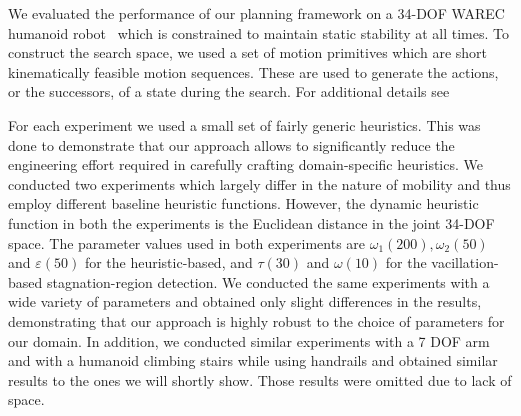 \documentclass{article}
\begin{document}
We evaluated the performance of our planning framework on a 34-DOF WAREC humanoid robot~\cite{MHSetal15} 
which is constrained to maintain static stability at all times. 
%
To construct the search space, we used a set of motion primitives which are short kinematically feasible motion sequences. 
These are used to generate the actions, or the successors, of a state during the search. 
For additional details see~\cite{DL18}


For each experiment we used a small set of fairly generic heuristics. 
This was done to demonstrate that our approach allows to significantly reduce the engineering effort required in carefully crafting domain-specific heuristics. 
We conducted two experiments which largely differ in the nature of mobility and thus employ different baseline heuristic functions. 
However, the dynamic heuristic function in both the experiments is the Euclidean distance in the joint 34-DOF space.
The parameter values used in both experiments are $\omega_1 (200), \omega_2 (50)$ and $\varepsilon (50)$ for the heuristic-based, and $\tau (30)$ and $\omega (10)$ for the vacillation-based stagnation-region detection.
We conducted the same experiments with a wide variety of parameters and obtained  only slight differences in the results, demonstrating that our approach is highly robust to the choice of parameters for our domain.
In addition, we conducted  similar experiments with a 7 DOF arm and with a humanoid climbing stairs while using handrails and obtained similar results to the ones we will shortly show. Those results were omitted due to lack of space.
\end{document}
